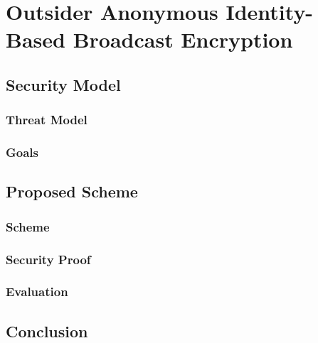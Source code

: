 \chapter{Outsider Anonymous Identity-Based Broadcast Encryption}
\label{cha:n}

\section{Security Model}

\subsection{Threat Model}

\subsection{Goals}

\section{Proposed Scheme}

\subsection{Scheme}

\subsection{Security Proof}

\subsection{Evaluation}

\section{Conclusion}

